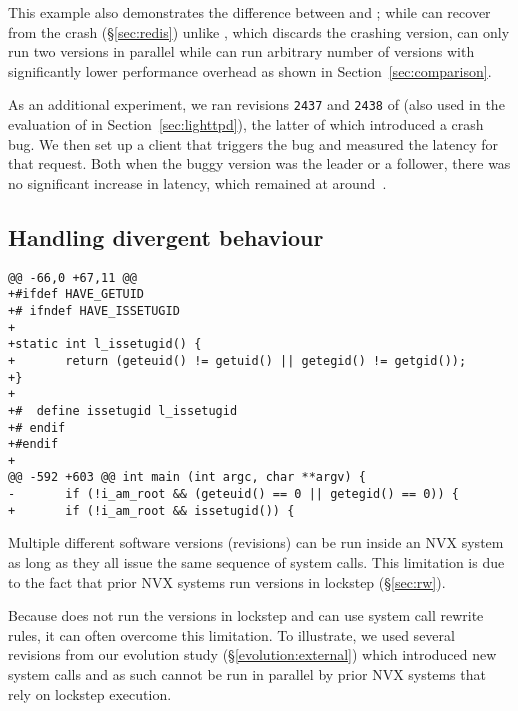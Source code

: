 This example also demonstrates the difference between \mx and \varan; while \mx
can recover from the crash (\S\ref{sec:redis}) unlike \varan, which discards
the crashing version, \mx can only run two versions in parallel while \varan
can run arbitrary number of versions with significantly lower performance
overhead as shown in Section~\ref{sec:comparison}.

As an additional experiment, we ran revisions \lstinline`2437` and
\lstinline`2438` of \lighttpd (also used in the evaluation of \mx in
Section~\ref{sec:lighttpd}), the latter of which introduced a crash bug.  We
then set up a client that triggers the bug and measured the latency for that
request. Both when the buggy version was the leader or a follower, there was no
significant increase in latency, which remained at
around~\lighttpdnormallatency.

\subsection{Handling divergent behaviour}
\label{sec:mv-execution}

\begin{lstlisting}[alsolanguage=diff,numbers=none,label=lst:lighttpd-suid,caption={\lighttpd SUID bit detection patch}]
@@ -66,0 +67,11 @@
+#ifdef HAVE_GETUID
+# ifndef HAVE_ISSETUGID
+
+static int l_issetugid() {
+       return (geteuid() != getuid() || getegid() != getgid());
+}
+
+#  define issetugid l_issetugid
+# endif
+#endif
+
@@ -592 +603 @@ int main (int argc, char **argv) {
-       if (!i_am_root && (geteuid() == 0 || getegid() == 0)) {
+       if (!i_am_root && issetugid()) {
\end{lstlisting}

Multiple different software versions (revisions) can be run inside an NVX
system as long as they all issue the same sequence of system calls. This
limitation is due to the fact that prior NVX systems run versions in lockstep
(\S\ref{sec:rw}).

Because \varan does not run the versions in lockstep and can use system call
rewrite rules, it can often overcome this limitation. To illustrate, we used
several \lighttpd revisions from our evolution study
(\S\ref{evolution:external}) which introduced new system calls and as such
cannot be run in parallel by prior NVX systems that rely on lockstep execution.

